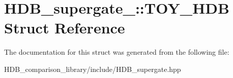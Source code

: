 \hypertarget{structHDB__supergate___1_1TOY__HDB}{}\section{H\+D\+B\+\_\+supergate\+\_\+\+:\+:T\+O\+Y\+\_\+\+H\+DB Struct Reference}
\label{structHDB__supergate___1_1TOY__HDB}


The documentation for this struct was generated from the following file\+:\begin{DoxyCompactItemize}
\item 
H\+D\+B\+\_\+comparison\+\_\+library/include/H\+D\+B\+\_\+supergate.\+hpp\end{DoxyCompactItemize}
